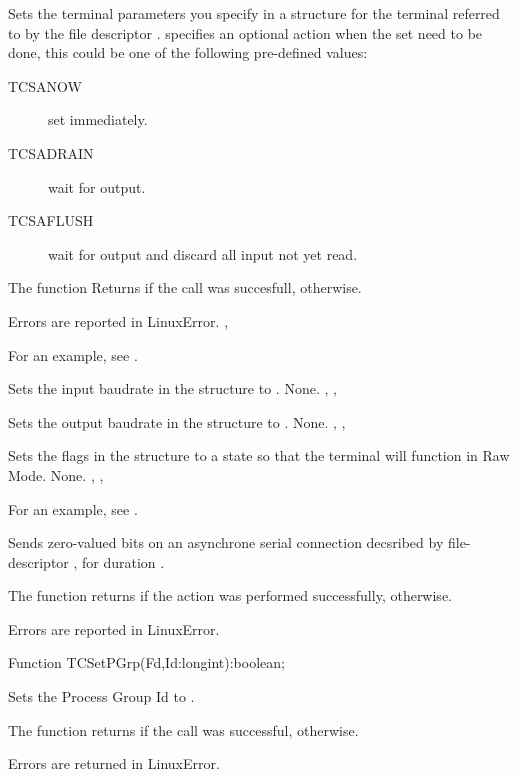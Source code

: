 

{ 
  Sets the terminal parameters you specify in a  structure
 for the terminal
  referred to by the file descriptor .  specifies an 
  optional action when the set need to be done,
  this could be one of the following pre-defined values:
 \begin{description}
\item [TCSANOW\ ] set immediately.
\item [TCSADRAIN\ ] wait for output.
\item [TCSAFLUSH\ ] wait for output and discard all input not yet read. 
\end{description}
The function Returns  if the call was succesfull,  
otherwise.
}
{Errors are reported in LinuxError.}
{, }

For an example, see .

{ 
  Sets the input baudrate in the  structure  to 
  .
}
{None.}
{, , }

{ 
  Sets the output baudrate in the  structure  to
  .
}
{None.}
{, , }

{ 
  Sets the flags in the  structure  to a state so that 
  the terminal will function in Raw Mode.
}
{None.}
{ , , }

For an example, see .

{  
  Sends zero-valued bits on an asynchrone serial connection decsribed by
  file-descriptor , for duration .

  The function returns  if the action was performed successfully,
 otherwise.
}
{Errors are reported in LinuxError.}
{}

Function TCSetPGrp(Fd,Id:longint):boolean;
{ 
  Sets the Process Group Id to . 

  The function returns  if the call was successful, 
otherwise.
}
{Errors are returned in LinuxError.}
{}

